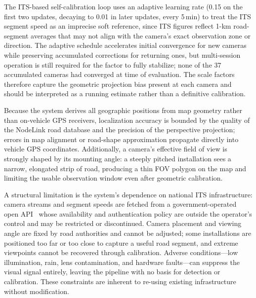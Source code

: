 \documentclass[conference]{IEEEtran}
\renewcommand{\_}{\textunderscore\allowbreak}
\begin{document}
The ITS-based self-calibration loop uses an adaptive learning rate (0.15 on the first two updates, decaying to 0.01 in later updates, every 5\,min) to treat the ITS segment speed as an imprecise soft reference, since ITS figures reflect 1-km road-segment averages that may not align with the camera's exact observation zone or direction.
The adaptive schedule accelerates initial convergence for new cameras while preserving accumulated corrections for returning ones, but multi-session operation is still required for the factor to fully stabilize; none of the 37 accumulated cameras had converged at time of evaluation. The scale factors therefore capture the geometric projection bias present at each camera and should be interpreted as a running estimate rather than a definitive calibration.

Because the system derives all geographic positions from map geometry rather than
on-vehicle GPS receivers, localization accuracy is bounded by the quality of the
NodeLink road database and the precision of the perspective projection; errors in
map alignment or road-shape approximation propagate directly into vehicle GPS
coordinates. Additionally, a camera's effective field of view is strongly shaped by
its mounting angle: a steeply pitched installation sees a narrow, elongated strip of
road, producing a thin FOV polygon on the map and limiting the usable observation
window even after geometric calibration.

A structural limitation is the system's dependence on national ITS
infrastructure: camera streams and segment speeds are fetched from a
government-operated open API~\cite{its_openapi} whose availability and
authentication policy are outside the operator's control and may be
restricted or discontinued. Camera placement and viewing angle are fixed by
road authorities and cannot be adjusted; some installations are positioned
too far or too close to capture a useful road segment, and extreme viewpoints
cannot be recovered through calibration. Adverse conditions---low
illumination, rain, lens contamination, and hardware faults---can suppress
the visual signal entirely, leaving the pipeline with no basis for detection
or calibration. These constraints are inherent to re-using existing
infrastructure without modification.

\end{document}
